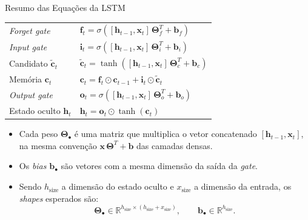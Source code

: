 \documentclass[aspectratio=169,xcolor=dvipsnames]{beamer}
\begin{document}
\begin{frame}{Resumo das Equações da LSTM}
\centering
\begin{tabular}{l l}
    \toprule
    \textit{Forget gate}    & $\mathbf{f}_t = \sigma([\mathbf{h}_{t-1}, \mathbf{x}_t]\,\mathbf{\Theta}_f^{T} + \mathbf{b}_f)$ \\
    \textit{Input gate}     & $\mathbf{i}_t = \sigma([\mathbf{h}_{t-1}, \mathbf{x}_t]\,\mathbf{\Theta}_i^{T} + \mathbf{b}_i)$ \\
    Candidato $\tilde{\mathbf{c}}_t$ & $\tilde{\mathbf{c}}_t = \tanh([\mathbf{h}_{t-1}, \mathbf{x}_t]\,\mathbf{\Theta}_c^{T} + \mathbf{b}_c)$ \\
    Memória $\mathbf{c}_t$           & $\mathbf{c}_t = \mathbf{f}_t \odot \mathbf{c}_{t-1} + \mathbf{i}_t \odot \tilde{\mathbf{c}}_t$ \\
    \textit{Output gate}    & $\mathbf{o}_t = \sigma([\mathbf{h}_{t-1}, \mathbf{x}_t]\,\mathbf{\Theta}_o^{T} + \mathbf{b}_o)$ \\
    Estado oculto $\mathbf{h}_t$     & $\mathbf{h}_t = \mathbf{o}_t \odot \tanh(\mathbf{c}_t)$ \\
    \bottomrule
\end{tabular}
\vspace{0.6em}
\begin{itemize}\footnotesize
    \item Cada peso $\mathbf{\Theta}_\bullet$ é uma matriz que multiplica o vetor concatenado $[\mathbf{h}_{t-1}, \mathbf{x}_t]$, na mesma convenção $\mathbf{x}\,\mathbf{\Theta}^{T} + \mathbf{b}$ das camadas densas.
    \item Os \textit{bias} $\mathbf{b}_\bullet$ são vetores com a mesma dimensão da saída da \textit{gate}.
    \item Sendo $h_{\text{size}}$ a dimensão do estado oculto e $x_{\text{size}}$ a dimensão da entrada, os \textit{shapes} esperados são:
    \[
        \mathbf{\Theta}_\bullet \in \mathbb{R}^{h_{\text{size}} \times (h_{\text{size}} + x_{\text{size}})}, \qquad \mathbf{b}_\bullet \in \mathbb{R}^{h_{\text{size}}}.
    \]
\end{itemize}
\end{frame}
\end{document}
